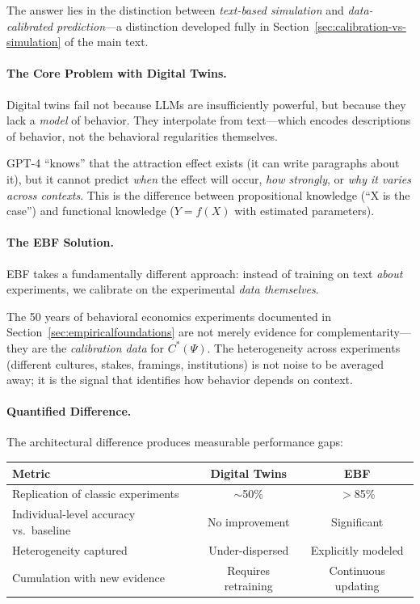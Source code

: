 The answer lies in the distinction between \emph{text-based simulation} and 
\emph{data-calibrated prediction}---a distinction developed fully in 
Section~\ref{sec:calibration-vs-simulation} of the main text.

\paragraph{The Core Problem with Digital Twins.}
Digital twins fail not because LLMs are insufficiently powerful, but because 
they lack a \emph{model} of behavior. They interpolate from text---which 
encodes descriptions of behavior, not the behavioral regularities themselves.

GPT-4 ``knows'' that the attraction effect exists (it can write paragraphs 
about it), but it cannot predict \emph{when} the effect will occur, 
\emph{how strongly}, or \emph{why it varies across contexts}. This is the 
difference between propositional knowledge (``X is the case'') and functional 
knowledge ($Y = f(X)$ with estimated parameters).

\paragraph{The EBF Solution.}
EBF takes a fundamentally different approach: instead of training on text 
\emph{about} experiments, we calibrate on the experimental \emph{data themselves}.

The 50 years of behavioral economics experiments documented in 
Section~\ref{sec:empiricalfoundations} are not merely evidence for 
complementarity---they are the \emph{calibration data} for $C^*(\Psi)$. 
The heterogeneity across experiments (different cultures, stakes, framings, 
institutions) is not noise to be averaged away; it is the signal that 
identifies how behavior depends on context.

\paragraph{Quantified Difference.}
The architectural difference produces measurable performance gaps:

\begin{center}
\renewcommand{\arraystretch}{1.3}
\begin{tabular}{lcc}
\hline
\textbf{Metric} & \textbf{Digital Twins} & \textbf{EBF} \\
\hline
Replication of classic experiments & $\sim$50\% & $>$85\% \\
Individual-level accuracy vs.\ baseline & No improvement & Significant \\
Heterogeneity captured & Under-dispersed & Explicitly modeled \\
Cumulation with new evidence & Requires retraining & Continuous updating \\
\hline
\end{tabular}
\end{center}


